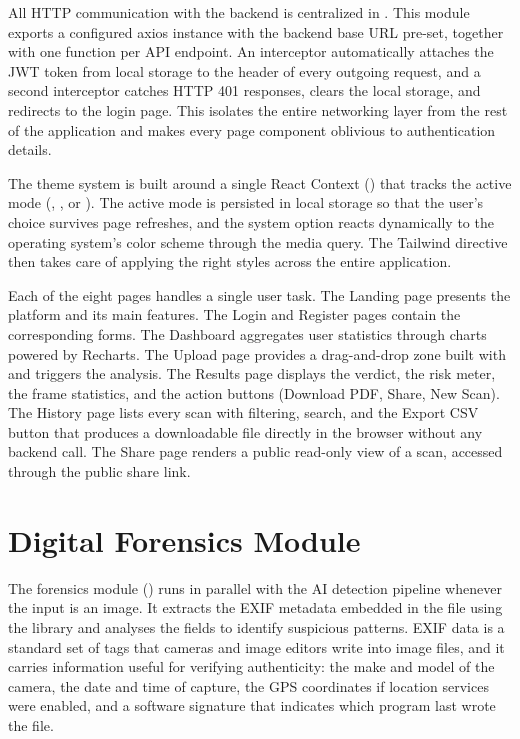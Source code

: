 All HTTP communication with the backend is centralized in . This module exports a configured axios instance with the backend base URL pre-set, together with one function per API endpoint. An interceptor automatically attaches the JWT token from local storage to the  header of every outgoing request, and a second interceptor catches HTTP 401 responses, clears the local storage, and redirects to the login page. This isolates the entire networking layer from the rest of the application and makes every page component oblivious to authentication details.

The theme system is built around a single React Context () that tracks the active mode (, , or ). The active mode is persisted in local storage so that the user's choice survives page refreshes, and the system option reacts dynamically to the operating system's color scheme through the  media query. The Tailwind  directive then takes care of applying the right styles across the entire application.

Each of the eight pages handles a single user task. The Landing page presents the platform and its main features. The Login and Register pages contain the corresponding forms. The Dashboard aggregates user statistics through charts powered by Recharts. The Upload page provides a drag-and-drop zone built with  and triggers the analysis. The Results page displays the verdict, the risk meter, the frame statistics, and the action buttons (Download PDF, Share, New Scan). The History page lists every scan with filtering, search, and the Export CSV button that produces a downloadable file directly in the browser without any backend call. The Share page renders a public read-only view of a scan, accessed through the public share link.

\section{Digital Forensics Module}

The forensics module () runs in parallel with the AI detection pipeline whenever the input is an image. It extracts the EXIF metadata embedded in the file using the  library and analyses the fields to identify suspicious patterns. EXIF data is a standard set of tags that cameras and image editors write into image files, and it carries information useful for verifying authenticity: the make and model of the camera, the date and time of capture, the GPS coordinates if location services were enabled, and a software signature that indicates which program last wrote the file.

